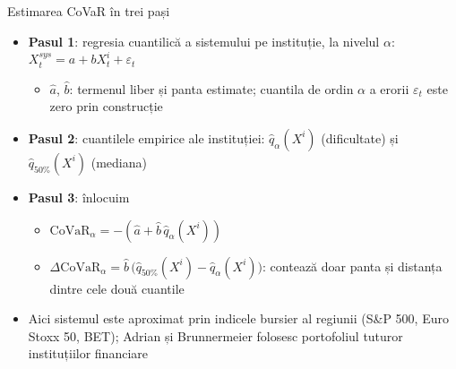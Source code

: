 \begin{frame}{Estimarea CoVaR în trei pași}
\itemsize{\small}
\begin{itemize}
    \item \textbf{Pasul 1}: regresia cuantilică a sistemului pe instituție, la nivelul $\alpha$: $X^{sys}_t = a + bX^i_t + \varepsilon_t$ 
    \begin{itemize}
        \item $\hat a$, $\hat b$: termenul liber și panta estimate; cuantila de ordin $\alpha$ a erorii $\varepsilon_t$ este zero prin construcție
    \end{itemize}
    \item \textbf{Pasul 2}: cuantilele empirice ale instituției: $\hat q_\alpha(X^i)$ (dificultate) și $\hat q_{50\%}(X^i)$ (mediana)
    \item \textbf{Pasul 3}: înlocuim
    \begin{itemize}
        \item $\mathrm{CoVaR}_\alpha = -(\hat a + \hat b\,\hat q_\alpha(X^i))$
        \item $\Delta\mathrm{CoVaR}_\alpha = \hat b\,\big(\hat q_{50\%}(X^i) - \hat q_\alpha(X^i)\big)$: contează doar panta și distanța dintre cele două cuantile
    \end{itemize}
    \item Aici sistemul este aproximat prin indicele bursier al regiunii (S\&P 500, Euro Stoxx 50, BET); Adrian și Brunnermeier folosesc portofoliul tuturor instituțiilor financiare
\end{itemize}
\end{frame}


